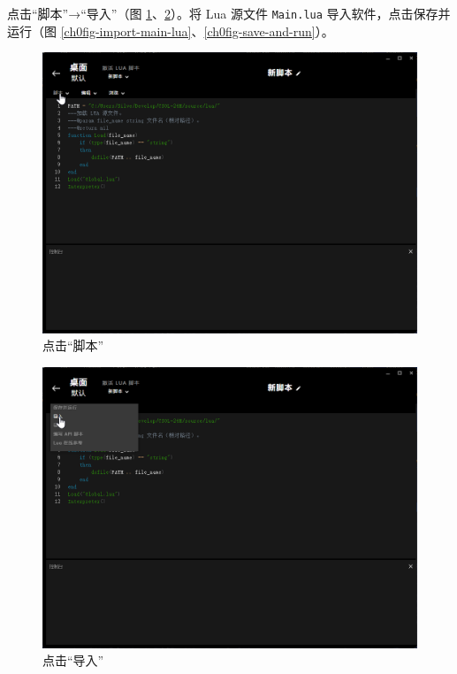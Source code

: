 点击“脚本”→“导入”（图 \ref{ch0fig-edit}、\ref{ch0fig-import}）。将 Lua 源文件 \lstinline{Main.lua} 导入软件，点击保存并运行（图 \ref{ch0fig-import-main-lua}、\ref{ch0fig-save-and-run}）。

\begin{figure}[H]
    \Centering
    \includegraphics[width=\textwidth]{docs/assets/intro/edit.png}
    \caption{点击“脚本”}
    \label{ch0fig-edit}
\end{figure}

\begin{figure}[H]
    \Centering
    \includegraphics[width=\textwidth]{docs/assets/intro/import.png}
    \caption{点击“导入”}
    \label{ch0fig-import}
\end{figure}

